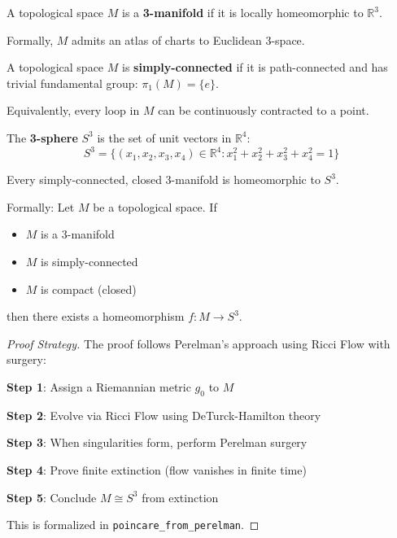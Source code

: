 \begin{definition}[3-Manifold]
\label{def:3manifold}
\leanok
A topological space $M$ is a \textbf{3-manifold} if it is locally homeomorphic to $\mathbb{R}^3$.

Formally, $M$ admits an atlas of charts to Euclidean 3-space.
\end{definition}

\begin{definition}
\label{def:simply_connected}
\leanok
A topological space $M$ is \textbf{simply-connected} if it is path-connected and has trivial fundamental group: $\pi_1(M) = \{e\}$.

Equivalently, every loop in $M$ can be continuously contracted to a point.
\end{definition}

\begin{definition}[3-Sphere]
\label{def:sphere3}
\leanok
The \textbf{3-sphere} $S^3$ is the set of unit vectors in $\mathbb{R}^4$:
\[
S^3 = \{(x_1, x_2, x_3, x_4) \in \mathbb{R}^4 : x_1^2 + x_2^2 + x_3^2 + x_4^2 = 1\}
\]
\end{definition}

\begin{theorem}
\label{thm:poincare_conjecture}
\leanok
{}
Every simply-connected, closed 3-manifold is homeomorphic to $S^3$.

Formally: Let $M$ be a topological space. If
\begin{itemize}
\item $M$ is a 3-manifold
\item $M$ is simply-connected
\item $M$ is compact (closed)
\end{itemize}
then there exists a homeomorphism $f : M \to S^3$.
\end{theorem}

\begin{proof}[Proof Strategy]
The proof follows Perelman's approach using Ricci Flow with surgery:

\textbf{Step 1}: Assign a Riemannian metric $g_0$ to $M$

\textbf{Step 2}: Evolve via Ricci Flow using DeTurck-Hamilton theory

\textbf{Step 3}: When singularities form, perform Perelman surgery

\textbf{Step 4}: Prove finite extinction (flow vanishes in finite time)

\textbf{Step 5}: Conclude $M \cong S^3$ from extinction

This is formalized in \texttt{poincare_from_perelman}.
\end{proof}

